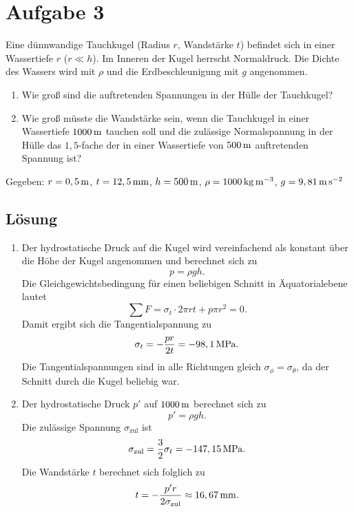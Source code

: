 \documentclass{exercise}
\begin{document}
    \section*{Aufgabe 3}

    \begin{problem}
        Eine dünnwandige Tauchkugel (Radius \(r\), Wandstärke \(t\)) befindet sich in einer Wassertiefe \(r\) (\(r \ll h\)).
        Im Inneren der Kugel herrscht Normaldruck.
        Die Dichte des Wassers wird mit \(\rho\) und die Erdbeschleunigung mit \(g\) angenommen.
        \begin{enumerate}
            \item Wie groß sind die auftretenden Spannungen in der Hülle der Tauchkugel?
            \item Wie groß müsste die Wandstärke sein, wenn die Tauchkugel in einer Wassertiefe \(1000\,\si{\meter}\) tauchen soll und die zulässige Normalspannung in der Hülle das \(1,5\)-fache der in einer Wassertiefe von \(500\,\si{\meter}\) auftretenden Spannung ist?
        \end{enumerate}
        Gegeben: \(r = 0,5\,\si{\meter}\), \(t = 12,5\,\si{\milli\meter}\), \(h = 500\,\si{\meter}\), \(\rho = 1000\,\si{\kilo\gram\per\meter\cubed}\), \(g = 9,81\,\si{\meter\per\second\squared}\)
    \end{problem}
    
    \subsection*{Lösung}
    \begin{enumerate}
        \item Der hydrostatische Druck auf die Kugel wird vereinfachend als konstant über die Höhe der Kugel angenommen und berechnet sich zu
        \[
            p = \rho gh.
        \]
        Die Gleichgewichtsbedingung für einen beliebigen Schnitt in Äquatorialebene lautet
        \[
            \sum F = \sigma_t \cdot 2\pi rt + p\pi r^2 = 0.
        \]
        Damit ergibt sich die Tangentialspannung zu
        \[
            \sigma_t = -\frac{pr}{2t} = -98,1\,\si{\mega\pascal}.
        \]
        Die Tangentialspannungen sind in alle Richtungen gleich \(\sigma_\phi = \sigma_\theta\), da der Schnitt durch die Kugel beliebig war.
        \item Der hydrostatische Druck \(p'\) auf \(1000\,\si{\meter}\) berechnet sich zu
        \[
            p' = \rho gh.
        \]
        Die zulässige Spannung \(\sigma_{\text{zul}}\) ist
        \[
            \sigma_{\text{zul}} = \frac{3}{2}\sigma_t = -147,15\,\si{\mega\pascal}.
        \]
        Die Wandstärke \(t\) berechnet sich folglich zu
        \[
            t = -\frac{p'r}{2\sigma_{\text{zul}}} \approx 16,67\,\si{\milli\meter}.
        \]
    \end{enumerate}
    
\end{document}
